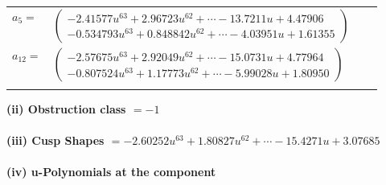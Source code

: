 \documentclass[1p]{elsarticle_modified}
\theoremstyle{definition}
\begin{document}
\begin{tabular}{m{7pt} m{180pt} m{7pt} m{180pt} }
\flushright $a_{5}=$&$\begin{pmatrix}-2.41577 u^{63}+2.96723 u^{62}+\cdots-13.7211 u+4.47906\\-0.534793 u^{63}+0.848842 u^{62}+\cdots-4.03951 u+1.61355\end{pmatrix}$ \\
\flushright $a_{12}=$&$\begin{pmatrix}-2.57675 u^{63}+2.92049 u^{62}+\cdots-15.0731 u+4.77964\\-0.807524 u^{63}+1.17773 u^{62}+\cdots-5.99028 u+1.80950\end{pmatrix}$\\&\end{tabular}
\flushleft \textbf{(ii) Obstruction class $= -1$}\\~\\
\flushleft \textbf{(iii) Cusp Shapes $= -2.60252 u^{63}+1.80827 u^{62}+\cdots-15.4271 u+3.07685$}\\~\\
\newpage\renewcommand{\arraystretch}{1}
\flushleft \textbf{(iv) u-Polynomials at the component}\newline \\
\end{document}
